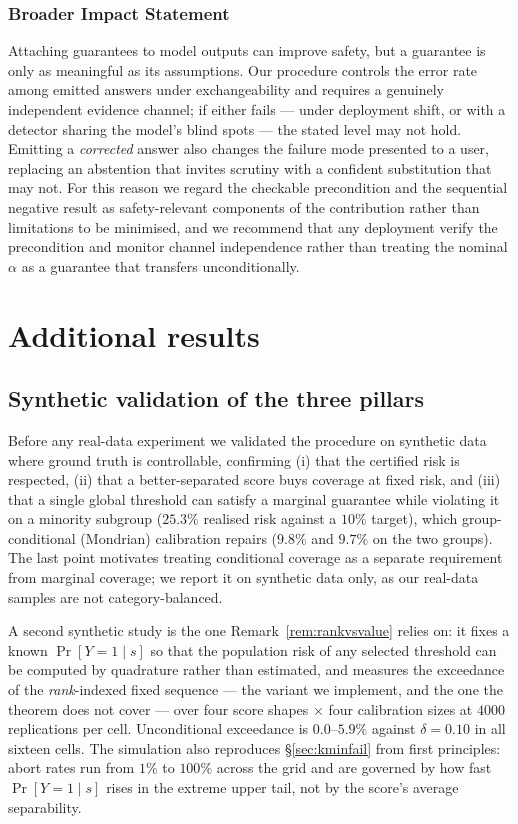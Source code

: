 \documentclass{article}
\theoremstyle{plain}
\theoremstyle{definition}
\theoremstyle{remark}
\begin{document}
\subsubsection*{Broader Impact Statement}
Attaching guarantees to model outputs can improve safety, but a guarantee is only as
meaningful as its assumptions. Our procedure controls the error rate among emitted answers
under exchangeability and requires a genuinely independent evidence channel; if either
fails --- under deployment shift, or with a detector sharing the model's blind spots --- the
stated level may not hold. Emitting a \emph{corrected} answer also changes the failure mode
presented to a user, replacing an abstention that invites scrutiny with a confident
substitution that may not. For this reason we regard the checkable precondition and the
sequential negative result as safety-relevant components of the contribution rather than
limitations to be minimised, and we recommend that any deployment verify the precondition
and monitor channel independence rather than treating the nominal $\alpha$ as a guarantee
that transfers unconditionally.




\appendix
\section{Additional results}

\subsection{Synthetic validation of the three pillars}
\label{app:synth}
Before any real-data experiment we validated the procedure on synthetic data where ground
truth is controllable, confirming (i) that the certified risk is respected, (ii) that a
better-separated score buys coverage at fixed risk, and (iii) that a single global
threshold can satisfy a marginal guarantee while violating it on a minority subgroup
($25.3\%$ realised risk against a $10\%$ target), which group-conditional (Mondrian)
calibration repairs ($9.8\%$ and $9.7\%$ on the two groups). The last point motivates
treating conditional coverage as a separate requirement from marginal coverage; we report it
on synthetic data only, as our real-data samples are not category-balanced.

A second synthetic study is the one Remark~\ref{rem:rankvsvalue} relies
on: it fixes a known $\Pr[Y=1\mid s]$ so that the population risk of any selected threshold can
be computed by quadrature rather than estimated, and measures the exceedance of the
\emph{rank}-indexed fixed sequence --- the variant we implement, and the one the theorem does not
cover --- over four score shapes $\times$ four calibration sizes at $4000$ replications per cell.
Unconditional exceedance is $0.0$--$5.9\%$ against $\delta=0.10$ in all sixteen cells. The
simulation also reproduces \S\ref{sec:kminfail} from first principles: abort rates run from $1\%$
to $100\%$ across the grid and are governed by how fast $\Pr[Y=1\mid s]$ rises in the extreme
upper tail, not by the score's average separability.
\end{document}

